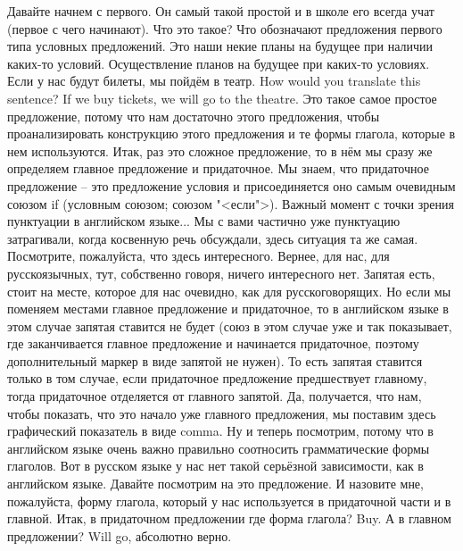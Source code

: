 \documentclass[main.tex]{subfiles}
\begin{document}
Давайте начнем с первого.
Он самый такой простой и в школе его всегда учат (первое с чего начинают).
Что это такое?
Что обозначают предложения первого типа условных предложений.
Это наши некие планы на будущее при наличии каких-то условий.
Осуществление планов на будущее при каких-то условиях.
Если у нас будут билеты, мы пойдём в театр.
How would you translate this sentence?
If we buy tickets, we will go to the theatre.
Это такое самое простое предложение, потому что нам достаточно этого предложения, чтобы проанализировать конструкцию этого предложения и те формы глагола, которые в нем используются.
Итак, раз это сложное предложение, то в нём мы сразу же определяем главное предложение и придаточное.
Мы знаем, что придаточное предложение -- это предложение условия и присоединяется оно самым очевидным союзом if (условным союзом; союзом "<если">).
Важный момент с точки зрения пунктуации в английском языке...
Мы с вами частично уже пунктуацию затрагивали, когда косвенную речь обсуждали, здесь ситуация та же самая.
Посмотрите, пожалуйста, что здесь интересного.
Вернее, для нас, для русскоязычных, тут, собственно говоря, ничего интересного нет.
Запятая есть, стоит на месте, которое для нас очевидно, как для русскоговорящих.
Но если мы поменяем местами главное предложение и придаточное, то в английском языке в этом случае запятая ставится не будет (союз в этом случае уже и так показывает, где заканчивается главное предложение и начинается придаточное, поэтому дополнительный маркер в виде запятой не нужен).
То есть запятая ставится только в том случае, если придаточное предложение предшествует главному, тогда придаточное отделяется от главного запятой.
Да, получается, что нам, чтобы показать, что это начало уже главного предложения, мы поставим здесь графический показатель в виде comma.
Ну и теперь посмотрим, потому что в английском языке очень важно правильно соотносить грамматические формы глаголов.
Вот в русском языке у нас нет такой серьёзной зависимости, как в английском языке.
Давайте посмотрим на это предложение.
И назовите мне, пожалуйста, форму глагола, который у нас используется в придаточной части и в главной.
Итак, в придаточном предложении где форма глагола?
Buy.
А в главном предложении?
Will go, абсолютно верно.
\end{document}
